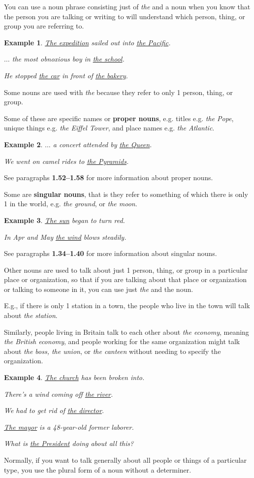 \documentclass[oneside]{book}
\numberwithin{equation}{section}
\newtheorem{example}{Example}[section]
\begin{document}
%
\noindent{} You can use a noun phrase consisting just of \textit{the} and a noun when you know that the person you are talking or writing to will understand which person, thing, or group you are referring to.
\begin{example}
    \underline{The expedition} sailed out into \underline{the Pacific}.
    
    $\ldots$ the most obnoxious boy in \underline{the school}.
    
    He stopped \underline{the car} in front of \underline{the bakery}.
\end{example}
%
\noindent{} Some nouns are used with \textit{the} because they refer to only 1 person, thing, or group.

Some of these are specific names or \textbf{proper nouns}, e.g. titles e.g. \textit{the Pope}, unique things e.g. \textit{the Eiffel Tower}, and place names e.g. \textit{the Atlantic}.
\begin{example}
    $\ldots$ a concert attended by \underline{the Queen}.
    
    We went on camel rides to \underline{the Pyramids}.
\end{example}
See paragraphs \textbf{1.52--1.58} for more information about proper nouns.

%
Some are \textbf{singular nouns}, that is they refer to something of which there is only 1 in the world, e.g. \textit{the ground}, or \textit{the moon}.
\begin{example}
    \underline{The sun} began to turn red.
    
    In Apr and May \underline{the wind} blows steadily.
\end{example}
See paragraphs \textbf{1.34--1.40} for more information about singular nouns.

%
\noindent{} Other nouns are used to talk about just 1 person, thing, or group in a particular place or organization, so that if you are talking about that place or organization or talking to someone in it, you can use just \textit{the} and the noun.

%
E.g., if there is only 1 station in a town, the people who live in the town will talk about \textit{the station}.

Similarly, people living in Britain talk to each other about \textit{the economy}, meaning \textit{the British economy}, and people working for the same organization might talk about \textit{the boss, the union}, or \textit{the canteen} without needing to specify the organization.
\begin{example}
    \underline{The church} has been broken into.
    
    There's a wind coming off \underline{the river}.
    
    We had to get rid of \underline{the director}.
    
    \underline{The mayor} is a 48-year-old former laborer.
    
    What is \underline{the President} doing about all this?
\end{example}
%
\noindent{} Normally, if you want to talk generally about all people or things of a particular type, you use the plural form of a noun without a determiner.
\end{document}
